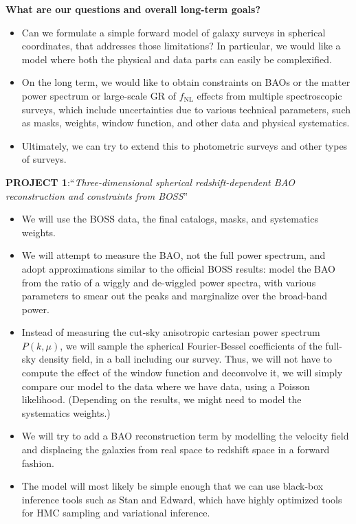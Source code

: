 \documentclass{aastex6}
\begin{document}
\textbf{What are our questions and overall long-term goals?}
\begin{itemize}
\item Can we formulate a simple forward model of galaxy surveys in spherical coordinates, that addresses those limitations? In particular, we would like a model where both the physical and data parts can easily be complexified.
\item On the long term, we would like to obtain constraints on BAOs or the matter power spectrum or large-scale GR of $f_{\mathrm{NL}}$ effects from multiple spectroscopic surveys, which include uncertainties due to various technical parameters, such as masks, weights, window function, and other data and physical systematics.
\item Ultimately, we can try to extend this to photometric surveys and other types of surveys.
\end{itemize}

\textbf{PROJECT 1}:``\textit{Three-dimensional spherical redshift-dependent BAO reconstruction and constraints from BOSS}''
\begin{itemize}
\item We will use the BOSS data, the final catalogs, masks, and systematics weights. 
\item We will attempt to measure the BAO, not the full power spectrum, and adopt approximations similar to the official BOSS results: model the BAO from the ratio of a wiggly and de-wiggled power spectra, with various parameters to smear out the peaks and marginalize over the broad-band power.
\item Instead of measuring the cut-sky anisotropic cartesian power spectrum $P(k,\mu)$, we will sample the spherical Fourier-Bessel coefficients of the full-sky  density field, in a ball including our survey. Thus, we will not have to compute the effect of the window function and deconvolve it, we will simply compare our model to the data where we have data, using a Poisson likelihood. (Depending on the results, we might need to model the systematics weights.)
\item We will try to add a BAO reconstruction term by modelling the velocity field and displacing the galaxies from real space to redshift space in a forward fashion.
\item The model will most likely be simple enough that we can use black-box inference tools such as Stan and Edward, which have highly optimized tools for HMC sampling and variational inference.
\end{itemize}
\end{document}
